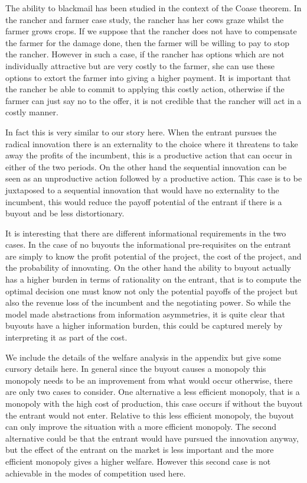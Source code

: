 \documentclass[12pt]{report}
\numberwithin{equation}{section}
\begin{document}
The ability to blackmail has been studied in the context of the Coase theorem\citep{Dem}. In the rancher and farmer case study, the rancher has her cows graze whilst the farmer grows crops. If we suppose that the rancher does not have to compensate the farmer for the damage done, then the farmer will be willing to pay to stop the rancher. However in such a case, if the rancher has options which are not individually attractive but are very costly to the farmer, she can use these options to extort the farmer into giving a higher payment. It is important that the rancher be able to commit to applying this costly action, otherwise if the farmer can just say no to the offer, it is not credible that the rancher will act in a costly manner. 

In fact this is very similar to our story here. When the entrant pursues the radical innovation there is an externality to the choice where it threatens to take away the profits of the incumbent, this is a productive action that can occur in either of the two periods. On the other hand the sequential innovation can be seen as an unproductive action followed by a productive action. This case is to be juxtaposed to a sequential innovation that would have no externality to the incumbent, this would reduce the payoff potential of the entrant if there is a buyout and be less distortionary. 

It is interesting that there are different informational requirements in the two cases. In the case of no buyouts the informational pre-requisites on the entrant are simply to know the profit potential of the project, the cost of the project, and the probability of innovating. On the other hand the ability to buyout actually has a higher burden in terms of rationality on the entrant, that is to compute the optimal decision one must know not only the potential payoffs of the project but also the revenue loss of the incumbent and the negotiating power. So while the model made abstractions from information asymmetries, it is quite clear that buyouts have a higher information burden, this could be captured merely by interpreting it as part of the cost. 

We include the details of the welfare analysis in the appendix but give some cursory details here. In general since the buyout causes a monopoly this monopoly needs to be an improvement from what would occur otherwise, there are only two cases to consider. One alternative a less efficient monopoly, that is a monopoly with the high cost of production, this case occurs if without the buyout the entrant would not enter. Relative to this less efficient monopoly, the buyout can only improve the situation with a more efficient monopoly. The second alternative could be that the entrant would have pursued the innovation anyway, but the effect of the entrant on the market is less important and the more efficient monopoly gives a higher welfare. However this second case is not achievable in the modes of competition used here.
\end{document}
